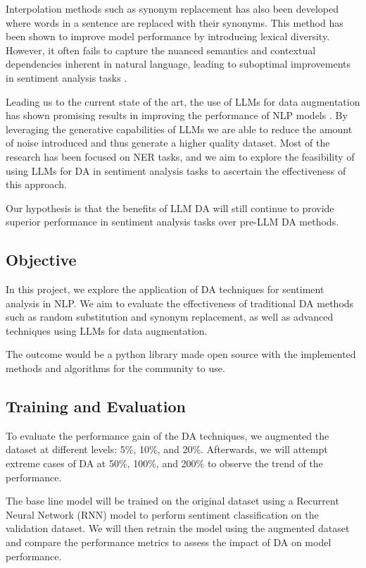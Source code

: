 \documentclass[10pt]{extarticle}
\begin{document}
Interpolation methods such as synonym replacement has also been developed
\cite{sahin-steedman-2018-data} where words in a sentence are replaced with
their synonyms. This method has been shown to improve model performance by
introducing lexical diversity. However, it often fails to capture the nuanced
semantics and contextual dependencies inherent in natural language, leading to
suboptimal improvements in sentiment analysis tasks
\cite{sahin-steedman-2018-data}.

Leading us to the current state of the art, the use of LLMs for data
augmentation has shown promising results in improving the performance of NLP
models \cite{ding-etal-2024-data}. By leveraging the generative capabilities of
LLMs we are able to reduce the amount of noise introduced and thus generate a
higher quality dataset. Most of the research has been focused on NER tasks, and
we aim to explore the feasibility of using LLMs for DA in sentiment analysis
tasks to ascertain the effectiveness of this approach.

Our hypothesis is that the benefits of LLM DA will still continue to provide
superior performance in sentiment analysis tasks over pre-LLM DA methods.

\subsection{Objective}

In this project, we explore the application of DA techniques for sentiment
analysis in NLP. We aim to evaluate the effectiveness of traditional DA methods
such as random substitution and synonym replacement, as well as advanced
techniques using LLMs for data augmentation.

The outcome would be a python library made open source with the implemented
methods and algorithms for the community to use.

\subsection{Training and Evaluation}

To evaluate the performance gain of the DA techniques, we augmented the dataset
at different levels: 5\%, 10\%, and 20\%. Afterwards, we will attempt extreme
cases of DA at 50\%, 100\%, and 200\% to observe the trend of the performance.

The base line model will be trained on the original dataset using a Recurrent
Neural Network (RNN) model to perform sentiment classification on the
validation dataset. We will then retrain the model using the augmented dataset
and compare the performance metrics to assess the impact of DA on model
performance.
\end{document}
